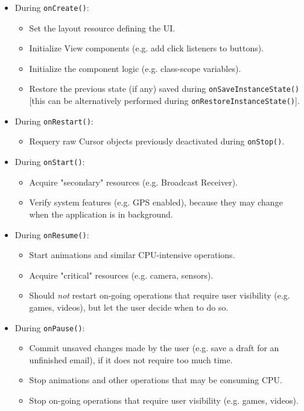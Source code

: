 \documentclass[11pt,a4paper,notitlepage]{article}
\begin{document}
\begin{itemize}
	\item During \texttt{onCreate()}:
	\begin{itemize}
		\item Set the layout resource defining the UI.
		\item Initialize View components (e.g. add click listeners to buttons).
		\item Initialize the component logic (e.g. class-scope variables).
		\item Restore the previous state (if any) saved during \texttt{onSaveInstanceState()} [this can be alternatively performed during \texttt{onRestoreInstanceState()}].
	\end{itemize}
	\item During \texttt{onRestart()}:
	\begin{itemize}
		\item Requery raw Cursor objects previously deactivated during \texttt{onStop()}.
	\end{itemize}
		\item During \texttt{onStart()}:
	\begin{itemize}
		\item Acquire "secondary" resources (e.g. Broadcast Receiver).
		\item Verify system features (e.g. GPS enabled), because they may change when the application is in background.
	\end{itemize}
	\item During \texttt{onResume()}:
	\begin{itemize}
		\item Start animations and similar CPU-intensive operations.
		\item Acquire "critical" resources (e.g. camera, sensors).
		\item Should \textit{not} restart on-going operations that require user visibility (e.g. games, videos), but let the user decide when to do so.
	\end{itemize}
	\item During \texttt{onPause()}:
	\begin{itemize}
		\item Commit unsaved changes made by the user (e.g. save a draft for an unfinished email), if it does not require too much time.
		\item Stop animations and other operations that may be consuming CPU.
		\item Stop on-going operations that require user visibility (e.g. games, videos).

\end{itemize}
\end{itemize}
\end{document}
